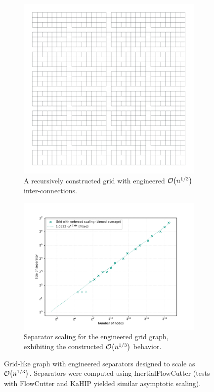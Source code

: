 \begin{figure}[tbhp]
	\centering
	\begin{subfigure}{0.35\linewidth}
		\centering
		\includegraphics[width=\linewidth]{graphics/cbrt_grid.png}
		\caption{A recursively constructed grid with engineered \(\mathcal{O}\!\left(n^{1/3}\right)\) inter-connections.}
		\label{fig:engineered_grid_structure_viz}
	\end{subfigure}
	\hfill
	\begin{subfigure}{0.55\linewidth}
		\centering
		\includegraphics[width=\linewidth]{graphics/cbrt_grid_sep_scaling.pdf}
		\caption{Separator scaling for the engineered grid graph, exhibiting the constructed \(\mathcal{O}\!\left(n^{1/3}\right)\) behavior.}
		\label{fig:engineered_grid_sep_plot}
	\end{subfigure}
	\caption{Grid-like graph with engineered separators designed to scale as \(\mathcal{O}\!\left(n^{1/3}\right)\). Separators were computed using InertialFlowCutter (tests with FlowCutter and KaHIP yielded similar asymptotic scaling).}
	\label{fig:engineered_grid_sep}
\end{figure}
